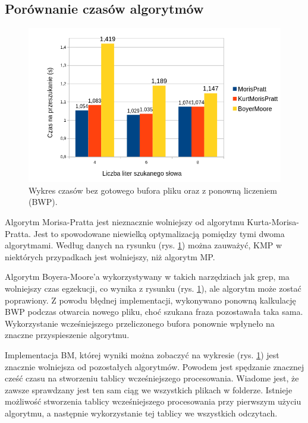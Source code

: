 \subsection{Porównanie czasów algorytmów}

\begin{figure}[htbp]
    \centering
    \includegraphics[width=\textwidth]{./images/GraphFirstAttempt.png}
    \caption{Wykres czasów bez gotowego bufora pliku oraz z ponowną 
    liczeniem (BWP).}
    \label{fig:GraphFirstAttempt}
\end{figure}

Algorytm Morisa-Pratta jest nieznacznie wolniejszy od algorytmu 
Kurta-Morisa-Pratta. Jest to spowodowane niewielką optymalizacją pomiędzy tymi 
dwoma algorytmami. Według danych na rysunku (rys. \ref{fig:GraphFirstAttempt}) można 
zauważyć, KMP w niektórych przypadkach jest wolniejszy, niż algorytm MP.

Algorytm Boyera-Moore'a wykorzystywany w takich narzędziach jak grep, ma 
wolniejszy czas egzekucji, co wynika z rysunku (rys. \ref{fig:GraphFirstAttempt}), ale 
algorytm może zostać poprawiony. Z powodu błędnej implementacji, wykonywano
ponowną kalkulację BWP podczas otwarcia nowego pliku, choć szukana fraza pozostawała
taka sama. Wykorzystanie wcześniejszego przeliczonego bufora ponownie wpłyneło na znaczne
przyspieszenie algorytmu.

Implementacja BM, której wyniki można zobaczyć na wykresie (rys. \ref{fig:GraphFirstAttempt}) jest
znacznie wolniejsza od pozostałych algorytmów. Powodem jest spędzanie znacznej
cześć czasu na stworzeniu tablicy wcześniejszego procesowania. Wiadome jest, że zawsze 
sprawdzany jest ten sam ciąg we wszystkich plikach w folderze. Istnieje możliwość 
stworzenia tablicy wcześniejszego procesowania przy pierwszym użyciu algorytmu, a następnie
wykorzystanie tej tablicy we wszystkich odczytach.

